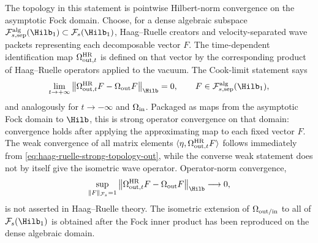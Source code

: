 The topology in this statement is pointwise Hilbert-norm convergence on the
asymptotic Fock domain.  Choose, for a dense algebraic subspace
\(\mathcal F_{s,{\rm sep}}^{\rm alg}(\Hilb_1)\subset\mathcal F_s(\Hilb_1)\),
Haag--Ruelle creators and velocity-separated wave packets representing each
decomposable vector \(F\).  The time-dependent identification map
\(\Omega_{{\rm out},t}^{\rm HR}\) is defined on that vector by the corresponding
product of Haag--Ruelle operators applied to the vacuum.  The Cook-limit
statement says
\begin{equation}
  \lim_{t\to+\infty}
  \left\|
    \Omega_{{\rm out},t}^{\rm HR}F-\Omega_{\rm out}F
  \right\|_{\Hilb}
  =0,
  \qquad
  F\in\mathcal F_{s,{\rm sep}}^{\rm alg}(\Hilb_1),
  \label{eq:haag-ruelle-strong-topology-out}
\end{equation}
and analogously for \(t\to-\infty\) and \(\Omega_{\rm in}\).  Packaged as
maps from the asymptotic Fock domain to \(\Hilb\), this is strong operator
convergence on that domain: convergence holds after applying the approximating
map to each fixed vector \(F\).  The weak convergence of all matrix elements
\(\langle\eta,\Omega_{{\rm out},t}^{\rm HR}F\rangle\) follows immediately from
\eqref{eq:haag-ruelle-strong-topology-out}, while the converse weak statement
does not by itself give the isometric wave operator.  Operator-norm
convergence,
\[
  \sup_{\|F\|_{\mathcal F_s}=1}
  \left\|
    \Omega_{{\rm out},t}^{\rm HR}F-\Omega_{\rm out}F
  \right\|_{\Hilb}\longrightarrow0,
\]
is not asserted in Haag--Ruelle theory.  The isometric extension of
\(\Omega_{\rm out/in}\) to all of \(\mathcal F_s(\Hilb_1)\) is obtained after
the Fock inner product has been reproduced on the dense algebraic domain.

